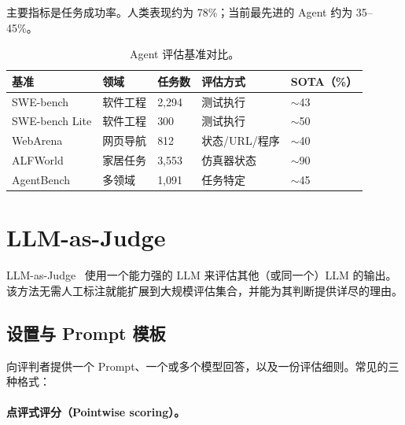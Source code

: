 主要指标是任务成功率。人类表现约为 78\%；当前最先进的 Agent 约为 35--45\%。

\begin{table}[ht!]
\centering\small
\caption{Agent 评估基准对比。}
\noindent\begin{tabularx}{\linewidth}{@{}l Z{0.9} Z{0.88} Z{1.35} Z{0.87}@{}}
\toprule
\textbf{基准} & \textbf{领域} & \textbf{任务数} & \textbf{评估方式} & \textbf{SOTA（\%）} \\
\midrule
SWE-bench & 软件工程 & 2,294 & 测试执行 & $\sim$43 \\
SWE-bench Lite & 软件工程 & 300 & 测试执行 & $\sim$50 \\
WebArena & 网页导航 & 812 & 状态/URL/程序 & $\sim$40 \\
ALFWorld~\cite{shridhar2021alfworld} & 家居任务 & 3,553 & 仿真器状态 & $\sim$90 \\
AgentBench~\cite{liu2023agentbench} & 多领域 & 1,091 & 任务特定 & $\sim$45 \\
\bottomrule
\end{tabularx}
\end{table}

\section{LLM-as-Judge}
\label{subsec:llm-as-judge}

LLM-as-Judge~\cite{zheng2023judging} 使用一个能力强的 LLM 来评估其他（或同一个）LLM 的输出。该方法无需人工标注就能扩展到大规模评估集合，并能为其判断提供详尽的理由。

\subsection{设置与 Prompt 模板}
\label{setup-and-prompt-templates}

向评判者提供一个 Prompt、一个或多个模型回答，以及一份评估细则。常见的三种格式：

\paragraph{点评式评分（Pointwise scoring）。}
\label{pointwise-scoring.}

